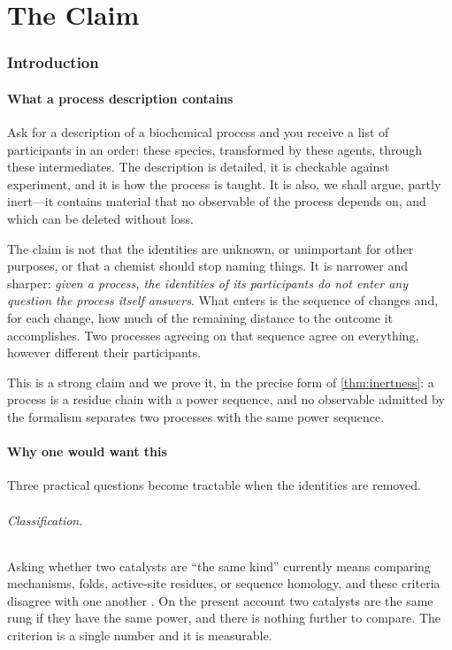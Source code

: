 \documentclass[11pt,twocolumn,a4paper]{article}
\theoremstyle{plain}
\theoremstyle{definition}
\theoremstyle{remark}
\begin{document}
\tableofcontents

\part{The Claim}

\section{Introduction}
\label{sec:introduction}

\subsection{What a process description contains}

Ask for a description of a biochemical process and you receive a list of
participants in an order: these species, transformed by these agents, through
these intermediates. The description is detailed, it is checkable against
experiment, and it is how the process is taught. It is also, we shall argue,
partly inert---it contains material that no observable of the process depends
on, and which can be deleted without loss.

The claim is not that the identities are unknown, or unimportant for other
purposes, or that a chemist should stop naming things. It is narrower and
sharper: \emph{given a process, the identities of its participants do not enter
any question the process itself answers}. What enters is the sequence of
changes and, for each change, how much of the remaining distance to the outcome
it accomplishes. Two processes agreeing on that sequence agree on everything,
however different their participants.

This is a strong claim and we prove it, in the precise form of
\cref{thm:inertness}: a process is a residue chain with a power sequence, and no
observable admitted by the formalism separates two processes with the same power
sequence.

\subsection{Why one would want this}

Three practical questions become tractable when the identities are removed.

\paragraph{Classification.} Asking whether two catalysts are ``the same kind''
currently means comparing mechanisms, folds, active-site residues, or
sequence homology, and these criteria disagree with one another
\citep{khersonsky2010}. On the present account two catalysts are the same rung
if they have the same power, and there is nothing further to compare. The
criterion is a single number and it is measurable.
\end{document}
